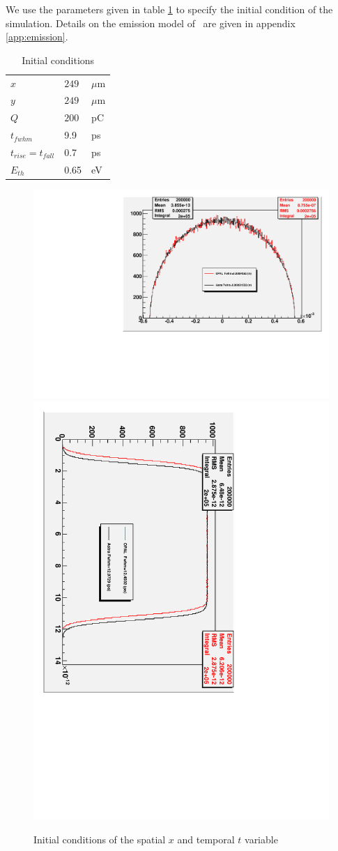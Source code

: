 \documentclass{psi-note}    %
\begin{document}
We use the parameters given in table \ref{tab:ic} to specify the initial
condition of the simulation. Details on the emission model of \opal\ are given
in appendix \ref{app:emission}. 
\begin{table}[h]\footnotesize
{\renewcommand{\arraystretch}{1.5}
\renewcommand{\tabcolsep}{0.5cm}}
\caption{Initial conditions}
\centering
  \label{tab:ic}
  \begin{tabular}{ l  l   l  }
    \hline
    
    $x$  &  $249 $ & $\mu$m \\
    $y$  &  $249 $ & $\mu$m \\
    $Q$  &  $200 $ & pC \\
    $t_{fwhm}$  & 9.9 & ps \\
$t_{rise}=t_{fall}$ & 0.7 & ps \\	
$E_{th}$ & 0.65 & eV \\
      \hline 
 \hline
  \end{tabular}
 \end{table}
\begin{figure}[htbp]
\begin{center}
\includegraphics[width=.49\linewidth,angle=0]{figures/opal-astra-x}
\includegraphics[width=.49\linewidth,angle=0]{figures/opal-astra-t}
\caption{Initial conditions of the spatial $x$ and temporal $t$ variable}
\label{fig:opal-astra-exrms-1}
\end{center}
\end{figure}
\end{document}
